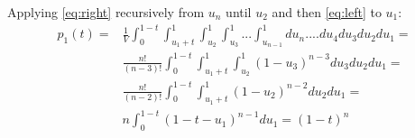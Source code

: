 \documentclass{llncs}
\begin{document}
Applying \ref{eq:right} recursively from $u_n$ until $u_2$ and then \ref{eq:left} to $u_1$:
\begin{eqnarray}
p_1(t) = & \displaystyle \frac{1}{V}\displaystyle \int_0^{1-t}\int_{{u_1}+t}^1\int_{u_2}^1\int_{u_3}^1...\int_{u_{n-1}}^1 du_n....du_4 du_3 du_2 du_1 =  \nonumber \\ 
&\displaystyle \frac{n!}{(n-3)!}\int_0^{1-t}\int_{{u_1}+t}^1\int_{u_2}^1 \left( 1-u_3 \right)^{n-3}du_3 du_2 du_1 =  \nonumber \\
&\displaystyle \frac{n!}{(n-2)!}\int_0^{1-t}\int_{{u_1}+t}^1\left( 1-u_2 \right)^{n-2} du_2 du_1 =  \nonumber \\
&\displaystyle n \int_0^{1-t}\left( 1-t-u_1 \right)^{n-1} du_1 = (1-t)^n \label{eq:p_1}
\end{eqnarray}

\end{document}
